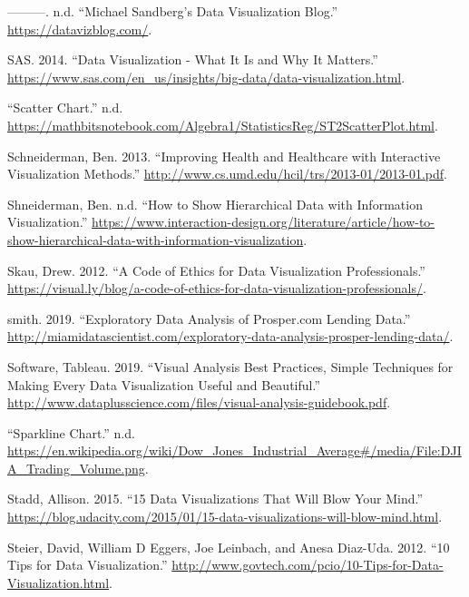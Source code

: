 \documentclass[]{book}
\begin{document}
\leavevmode\hypertarget{ref-Michael_Sandberg_blog}{}%
---------. n.d. ``Michael Sandberg's Data Visualization Blog.'' \url{https://datavizblog.com/}.

\leavevmode\hypertarget{ref-why_dataviz_matters}{}%
SAS. 2014. ``Data Visualization - What It Is and Why It Matters.'' \url{https://www.sas.com/en_us/insights/big-data/data-visualization.html}.

\leavevmode\hypertarget{ref-scatter}{}%
``Scatter Chart.'' n.d. \url{https://mathbitsnotebook.com/Algebra1/StatisticsReg/ST2ScatterPlot.html}.

\leavevmode\hypertarget{ref-data_viz_healthcare}{}%
Schneiderman, Ben. 2013. ``Improving Health and Healthcare with Interactive Visualization Methods.'' \url{http://www.cs.umd.edu/hcil/trs/2013-01/2013-01.pdf}.

\leavevmode\hypertarget{ref-tier-chart}{}%
Shneiderman, Ben. n.d. ``How to Show Hierarchical Data with Information Visualization.'' \url{https://www.interaction-design.org/literature/article/how-to-show-hierarchical-data-with-information-visualization}.

\leavevmode\hypertarget{ref-ethics_code}{}%
Skau, Drew. 2012. ``A Code of Ethics for Data Visualization Professionals.'' \url{https://visual.ly/blog/a-code-of-ethics-for-data-visualization-professionals/}.

\leavevmode\hypertarget{ref-david_2019}{}%
smith. 2019. ``Exploratory Data Analysis of Prosper.com Lending Data.'' \url{http://miamidatascientist.com/exploratory-data-analysis-prosper-lending-data/}.

\leavevmode\hypertarget{ref-analyze_viz}{}%
Software, Tableau. 2019. ``Visual Analysis Best Practices, Simple Techniques for Making Every Data Visualization Useful and Beautiful.'' \url{http://www.dataplusscience.com/files/visual-analysis-guidebook.pdf}.

\leavevmode\hypertarget{ref-sparklines}{}%
``Sparkline Chart.'' n.d. \url{https://en.wikipedia.org/wiki/Dow_Jones_Industrial_Average\#/media/File:DJIA_Trading_Volume.png}.

\leavevmode\hypertarget{ref-15_mindblowing}{}%
Stadd, Allison. 2015. ``15 Data Visualizations That Will Blow Your Mind.'' \url{https://blog.udacity.com/2015/01/15-data-visualizations-will-blow-mind.html}.

\leavevmode\hypertarget{ref-Steier}{}%
Steier, David, William D Eggers, Joe Leinbach, and Anesa Diaz-Uda. 2012. ``10 Tips for Data Visualization.'' \url{http://www.govtech.com/pcio/10-Tips-for-Data-Visualization.html}.
\end{document}
